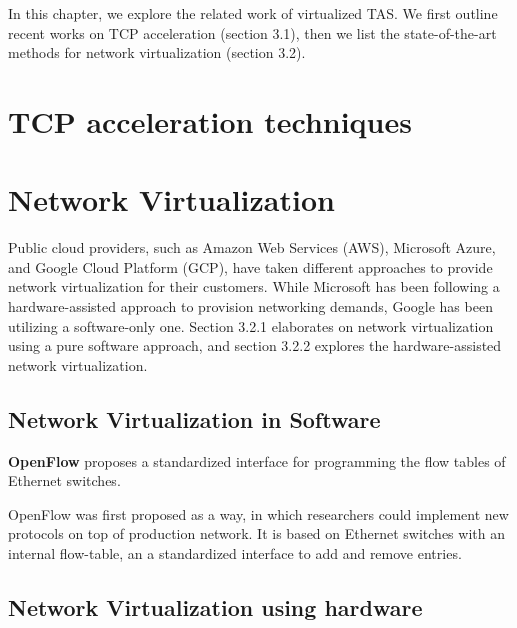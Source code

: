  In this chapter, we explore the related work of virtualized TAS. We first outline recent 
 works on TCP acceleration (section 3.1), then we list the state-of-the-art methods for network virtualization (section 3.2).



\section{TCP acceleration techniques}


\section{Network Virtualization}
Public cloud providers, such as Amazon Web Services (AWS), Microsoft Azure, and Google Cloud Platform (GCP), have taken different approaches to provide network virtualization for their customers. While Microsoft has been following a hardware-assisted approach to provision networking demands, Google has been utilizing a software-only one. Section 3.2.1 elaborates on network 
virtualization using a pure software approach, and section 3.2.2 explores the hardware-assisted network virtualization.


\subsection{Network Virtualization in Software}

\textbf{OpenFlow} proposes a standardized interface for programming the 
flow tables of Ethernet switches. \cite{mckeown2008openflow}

OpenFlow was first proposed as a way, in which researchers could implement new protocols
on top of production network. It is based on Ethernet switches with an internal flow-table,
an a standardized interface to add and remove entries.






\subsection{Network Virtualization using hardware}
